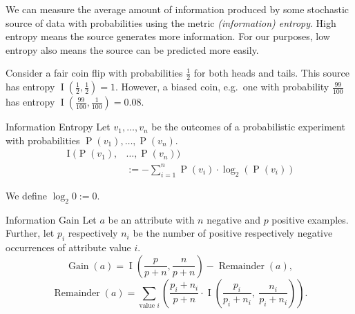 \documentclass[english]{panikzettel}
\begin{document}
\begin{halfboxl}
We can measure the average amount of information produced by some stochastic source of data with probabilities using the metric \emph{(information) entropy}.
High entropy means the source generates more information.
For our purposes, low entropy also means the source can be predicted more easily.

Consider a fair coin flip with probabilities $\frac{1}{2}$ for both heads and tails.
This source has entropy $\operatorname I(\frac{1}{2}, \frac{1}{2}) = 1$.
However, a biased coin, e.g.\ one with probability $\frac{99}{100}$ has entropy $\operatorname I (\frac {99}{100},\frac 1 {100}) = 0.08$.
\end{halfboxl}%
\begin{halfboxr}
\vspace{-\baselineskip}
\begin{defi}{Information Entropy}
Let $v_1,\ldots,v_n$ be the outcomes of a probabilistic experiment with probabilities $\operatorname P(v_1),\dots,\operatorname P(v_n)$.
\begin{align*}
\operatorname I(\operatorname P(v_1),&\dots,\operatorname P(v_n)) \\
&:= -\sum\limits_{i=1}^n \operatorname{P} (v_i) \cdot \log_2 (\operatorname{P}(v_i))
\end{align*}

{\footnotesize We define $\log_2 0 := 0$.}
\end{defi}
\end{halfboxr}
\vspace{-0.5\baselineskip}
\begin{defi}{Information Gain}
Let $a$ be an attribute with $n$ negative and $p$ positive examples.
Further, let $p_i$ respectively $n_i$ be the number of positive respectively negative occurrences of attribute value $i$.
\[\operatorname{Gain} (a) = \operatorname{I}(\frac{p}{p+n}, \frac{n}{p+n}) - \operatorname{Remainder} (a),\]
\[\operatorname{Remainder} (a) = \sum\limits_\text{value $i$} \left (\frac{p_i + n_i}{p+n} \cdot \operatorname{I} \left ( \frac{p_i}{p_i+n_i},~ \frac{n_i}{p_i+n_i} \right) \right ).\]
\end{defi}
\end{document}
